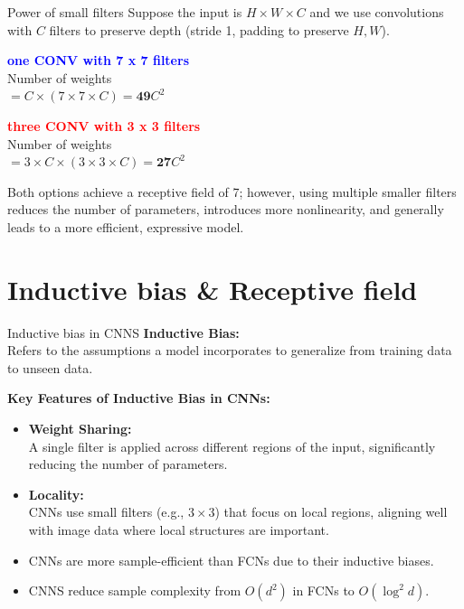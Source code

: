 \documentclass[default, aspectratio=169]{beamer}
\begin{document}
	\begin{frame}{Power of small filters}
		Suppose the input is $H \times W \times C$ and we use convolutions with $C$ filters to preserve depth (stride 1, padding to preserve $H, W$).
		
		\bigskip
		\begin{minipage}{0.45\textwidth}
			\textcolor{blue}{\textbf{one CONV with 7 x 7 filters}} \\
			Number of weights \\
			$= C \times (7 \times 7 \times C) = \textbf{49} C^2$
		\end{minipage}
		\hfill
		\begin{minipage}{0.45\textwidth}
			\textcolor{red}{\textbf{three CONV with 3 x 3 filters}} \\
			Number of weights \\
			$= 3 \times C \times (3 \times 3 \times C) = \textbf{27} C^2$
		\end{minipage}
		\bigskip
		\begin{flushleft}
			Both options achieve a receptive field of 7; however, using multiple smaller filters reduces the number of parameters, introduces more nonlinearity, and generally leads to a more efficient, expressive model.
		\end{flushleft}
	\end{frame}
	\section{Inductive bias \& Receptive field}
	
	
	\begin{frame}{Inductive bias in CNNS}
		\textbf{Inductive Bias:} \\
		Refers to the assumptions a model incorporates to generalize from training data to unseen data.
		
		\bigskip
		\textbf{Key Features of Inductive Bias in CNNs:}
		\begin{itemize}
			\item \textbf{Weight Sharing:} \\
			A single filter is applied across different regions of the input, significantly reducing the number of parameters.
			
			\item \textbf{Locality:} \\
			CNNs use small filters (e.g., $3 \times 3$) that focus on local regions, aligning well with image data where local structures are important.
			
			\item CNNs are more sample-efficient than FCNs due to their inductive biases.
			\item CNNS reduce sample complexity from $O(d^2)$ in FCNs to $O(\log^2 d)$.
		\end{itemize}
	\end{frame}
	
\end{document}

